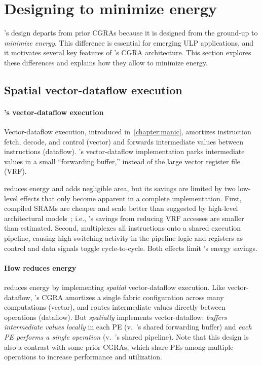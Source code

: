 \section{Designing \snafuframe to minimize energy}
\label{snafu:energy}

\snafuframe's design departs from prior CGRAs because it is designed from the ground-up to \emph{minimize energy}.
This difference is essential for emerging ULP applications,
and it motivates several key features of \snafuframe's CGRA architecture.
%
This section explores these differences and explains how they allow \snafuframe to minimize energy.

\subsection{Spatial vector-dataflow execution}

\paragraph{\manic's vector-dataflow execution}
Vector-dataflow execution, introduced in~\autoref{chapter:manic}, amortizes instruction fetch, decode, and control (vector)
and forwards intermediate values between instructions (dataflow).
% 
\manic's vector-dataflow implementation parks intermediate values in a small ``forwarding buffer,'' instead of the large vector register file (VRF).

\manic reduces energy and adds negligible area,
but its savings are limited by two low-level effects that only become apparent in a complete implementation.
First, compiled SRAMs are cheaper and scale better than
suggested by high-level architectural models~\cite{cacti,destiny};
i.e., \manic's savings from reducing VRF accesses are smaller than estimated.
Second, \manic multiplexes all instructions onto a shared execution pipeline,
causing high switching activity in the pipeline logic and registers as control and data signals toggle cycle-to-cycle.
Both effects limit \manic's energy savings.

\paragraph{How \snafu reduces energy}
%
\snafuframe reduces energy by implementing \emph{spatial} vector-dataflow
execution.
%
Like vector-dataflow,
\snafuframe's CGRA amortizes a single fabric configuration across many computations (vector),
and routes intermediate values directly between operations (dataflow).
%
But \snafuframe \emph{spatially} implements vector-dataflow:
\snafuframe \emph{buffers intermediate values locally} in each PE (v.\ \manic's shared forwarding buffer)
and \emph{each PE performs a single operation} (v.\ \manic's shared pipeline).
%
Note that this design is also a contrast with some prior CGRAs, which share PEs among
multiple operations to increase performance and utilization.

